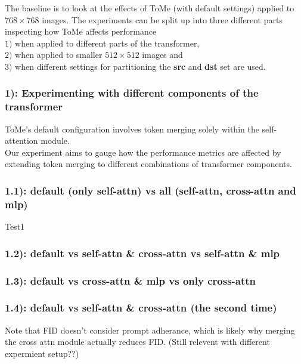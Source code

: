 The baseline is to look at the effects of ToMe (with default settings) applied to $768 \times 768$ images. The experiments can be split up into three different parts inspecting how ToMe affects performance\\ \(1)\) when applied to different parts of the transformer,\\ \(2)\) when applied to smaller $512 \times 512$ images and\\ \(3)\) when different settings for partitioning the \textbf{src} and \textbf{dst} set are used.

\subsubsection*{1): Experimenting with different components of the transformer}
ToMe's default configuration involves token merging solely within the self-attention module.\\
Our experiment aims to gauge how the performance metrics are affected by extending token merging to different combinations of transformer components.

\subsubsection*{1.1): default (only self-attn) vs all (self-attn, cross-attn and mlp)}
\begin{figure}[!htb]
   
   
\end{figure}
Test1

\newpage
\subsubsection*{1.2): default vs self-attn \& cross-attn vs self-attn \& mlp}
\begin{figure}[!htb]
    
    
\end{figure}

\subsubsection*{1.3): default vs cross-attn \& mlp vs only cross-attn}
\begin{figure}[!htb]
    
    
\end{figure}

\newpage
\subsubsection*{1.4): default vs self-attn \& cross-attn (the second time)}
Note that FID doesn’t consider prompt adherance, which is likely why merging the cross attn module actually reduces FID. (Still relevent with different expermient setup??)
\begin{figure}[!htb]
    
    
\end{figure}

